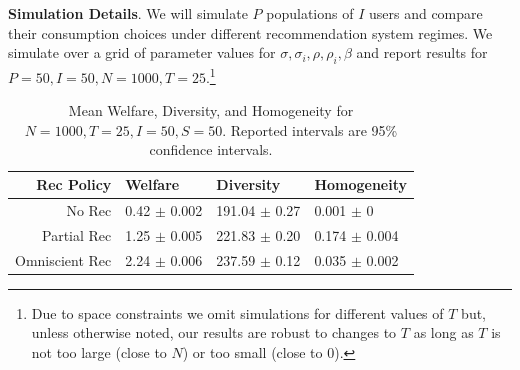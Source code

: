 \documentclass[sigconf]{acmart}
\begin{document}
\par
\noindent \textbf{Simulation Details}. We will simulate $P$ populations of $I$ users and compare their consumption choices under different recommendation system regimes. We simulate over a grid of parameter values for $\sigma, \sigma_i, \rho, \rho_i, \beta$ and report results for $P=50, I = 50, N = 1000, T = 25$.\footnote{Due to space constraints we omit simulations for different values of $T$ but, unless otherwise noted, our results are robust to changes to $T$ as long as $T$ is not too large (close to $N$) or too small (close to $0$).}
\par

\begin{table}[bt]
\centering
\begin{tabular}{rlll}
  \hline
Rec Policy & Welfare & Diversity & Homogeneity \\ 
  \hline
No Rec & 0.42 $\pm$ 0.002 & 191.04 $\pm$ 0.27 & 0.001 $\pm$ 0 \\ 
Partial Rec & 1.25 $\pm$ 0.005 & 221.83 $\pm$ 0.20 & 0.174 $\pm$ 0.004 \\ 
Omniscient Rec & 2.24 $\pm$ 0.006 & 237.59 $\pm$ 0.12 & 0.035 $\pm$ 0.002 \\ 
   \hline
\end{tabular}
\caption{Mean Welfare, Diversity, and Homogeneity for $N = 1000, T = 25, I = 50, S = 50$. Reported intervals are 95\% confidence intervals.}
\label{table:agg_results}
\end{table}
\end{document}
